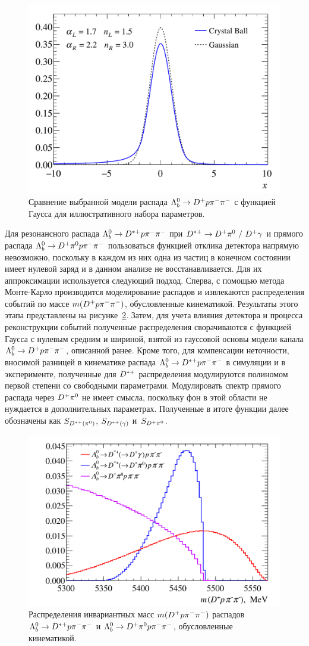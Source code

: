 \begin{figure}%
  \centering
  \includegraphics[width=.5\linewidth]{figures/crystalball}
  \caption{Сравнение выбранной модели распада $\Lb\to\Dp\p\pim\pim$ 
  с функцией Гаусса для иллюстративного набора параметров.}
  \label{fig:crystalball}
\end{figure}%

Для резонансного распада $\Lb\to\Dstarp\p\pim\pim$ при 
$\Dstarp\to\Dp\piz\ /\ \Dp\gamma$ и прямого распада 
$\Lb\to\Dp\piz\p\pim\pim$ пользоваться функцией отклика детектора 
напрямую невозможно, поскольку в каждом из них одна из частиц в конечном 
состоянии имеет нулевой заряд и в данном анализе не восстанавливается. 
Для их аппроксимации используется следующий подход. Сперва, с помощью 
метода Монте-Карло производится моделирование распадов и извлекаются 
распределения событий по массе $m({D^+}{p}{\pi^-}{\pi^-})$, обусловленные 
кинематикой. Результаты этого этапа представлены на 
рисунке~\ref{fig:dstar-dpiz-simulation}. Затем, для учета влияния 
детектора и процесса реконструкции событий полученные распределения 
сворачиваются с функцией Гаусса с нулевым средним и шириной, взятой из 
гауссовой основы модели канала $\Lb\to\Dp\p\pim\pim$, описанной ранее. 
Кроме того, для компенсации неточности, вносимой разницей в кинематике 
распада $\Lb\to\Dstarp\p\pim\pim$ в симуляции и в эксперименте, 
полученные для ${D^{*+}}$ распределения модулируются полиномом первой 
степени со свободными параметрами. Модулировать спектр прямого распада 
через ${D^+}{\pi^0}$ не имеет смысла, поскольку фон в этой области не 
нуждается в дополнительных параметрах. Полученные в итоге функции далее 
обозначены как $S_{{D^{*+}}({\pi^0})}$, $S_{{D^{*+}}(\gamma)}$ 
и~$S_{{D^+}{\pi^0}}$.

\begin{figure}%
  \centering
  \includegraphics[width=.5\linewidth]{figures/dstar-dpiz-simulation}
  \caption{Распределения инвариантных масс $m({D^+}{p}{\pi^-}{\pi^-})$ распадов 
  \mbox{$\Lb\to\Dstarp\p\pim\pim$} и $\Lb\to\Dp\piz\p\pim\pim$, обусловленные 
  кинематикой.}
  \label{fig:dstar-dpiz-simulation}
\end{figure}%

